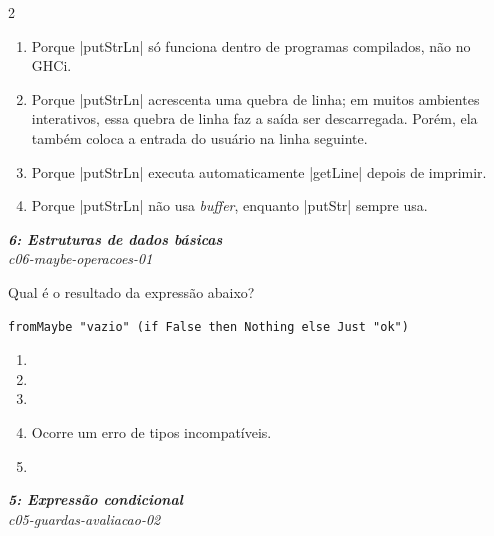 \documentclass[a4paper,10pt,brazil]{article}
\begin{document}
\begin{multicols}{2}
\begin{enumerate}
  \item Porque \haskellinline|putStrLn| só funciona dentro de programas compilados, não no GHCi.

  \item Porque \haskellinline|putStrLn| acrescenta uma quebra de linha; em muitos ambientes interativos, essa quebra de linha faz a saída ser descarregada. Porém, ela também coloca a entrada do usuário na linha seguinte.

  \item Porque \haskellinline|putStrLn| executa automaticamente \haskellinline|getLine| depois de imprimir.

  \item Porque \haskellinline|putStrLn| não usa \emph{buffer}, enquanto \haskellinline|putStr| sempre usa.


\end{enumerate}

\begin{flushright}
  \footnotesize
  \textit{\textbf{6: Estruturas de dados básicas}}\\
  \textit{c06-maybe-operacoes-01}\\

\end{flushright}
Qual é o resultado da expressão abaixo?
\begin{verbatim}
fromMaybe "vazio" (if False then Nothing else Just "ok")
\end{verbatim}

\begin{enumerate}
  \item {}

  \item {}

  \item {}

  \item Ocorre um erro de tipos incompatíveis.

  \item {}


\end{enumerate}

\begin{flushright}
  \footnotesize
  \textit{\textbf{5: Expressão condicional}}\\
  \textit{c05-guardas-avaliacao-02}\\


\end{flushright}
\end{multicols}
\end{document}
